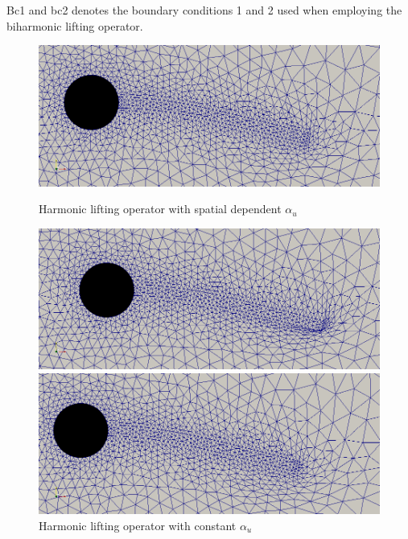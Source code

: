 Bc1 and bc2 denotes the boundary conditions 1 and 2 used when employing the biharmonic lifting operator.
\begin{figure}[H]  
  \begin{minipage}[b]{0.6\linewidth}
    \centering
    \includegraphics[scale=0.25]{./Mesh_motion_results/CSM1_laplace.png} 
    \caption{Harmonic lifting operator with spatial dependent $\alpha_u$} 
    \vspace{4ex}
  \end{minipage}%
  \begin{minipage}[b]{0.6\linewidth}
    \centering
    \includegraphics[scale=0.25]{./Mesh_motion_results/CSM1_constant.png} 
    \caption{Harmonic lifting operator with constant $\alpha_u$} 
    \vspace{4ex}
  \end{minipage} 
  \begin{minipage}[b]{0.6\linewidth}
    \centering
    \includegraphics[scale=0.25]{./Mesh_motion_results/CSM1_bibc1.png} 

\end{minipage}
\end{figure}
